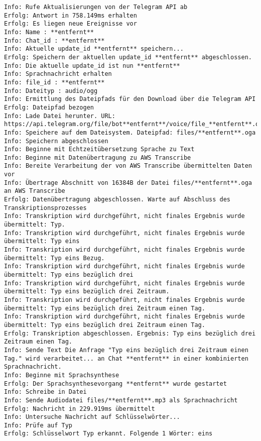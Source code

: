\begin{lstlisting}[caption={Konsolenausgabe bei der Verarbeitung einer eintreffenden Nachricht}, label=log-msg, xleftmargin=6mm]
Info: Rufe Aktualisierungen von der Telegram API ab 
Erfolg: Antwort in 758.149ms erhalten 
Erfolg: Es liegen neue Ereignisse vor 
Info: Name : **entfernt** 
Info: Chat_id : **entfernt** 
Info: Aktuelle update_id **entfernt** speichern... 
Erfolg: Speichern der aktuellen update_id **entfernt** abgeschlossen. 
Info: Die aktuelle update_id ist nun **entfernt** 
Info: Sprachnachricht erhalten 
Info: file_id : **entfernt** 
Info: Dateityp : audio/ogg 
Info: Ermittlung des Dateipfads für den Download über die Telegram API 
Erfolg: Dateipfad bezogen 
Info: Lade Datei herunter. URL: https://api.telegram.org/file/bot**entfernt**/voice/file_**entfernt**.oga 
Info: Speichere auf dem Dateisystem. Dateipfad: files/**entfernt**.oga 
Info: Speichern abgeschlossen 
Info: Beginne mit Echtzeitübersetzung Sprache zu Text 
Info: Beginne mit Datenübertragung zu AWS Transcribe 
Info: Bereite Verarbeitung der von AWS Transcribe übermittelten Daten vor 
Info: Übertrage Abschnitt von 16384B der Datei files/**entfernt**.oga an AWS Transcribe 
Erfolg: Datenübertragung abgeschlossen. Warte auf Abschluss des Transkriptionsprozesses 
Info: Transkription wird durchgeführt, nicht finales Ergebnis wurde übermittelt: Typ. 
Info: Transkription wird durchgeführt, nicht finales Ergebnis wurde übermittelt: Typ eins 
Info: Transkription wird durchgeführt, nicht finales Ergebnis wurde übermittelt: Typ eins Bezug. 
Info: Transkription wird durchgeführt, nicht finales Ergebnis wurde übermittelt: Typ eins bezüglich drei 
Info: Transkription wird durchgeführt, nicht finales Ergebnis wurde übermittelt: Typ eins bezüglich drei Zeitraum. 
Info: Transkription wird durchgeführt, nicht finales Ergebnis wurde übermittelt: Typ eins bezüglich drei Zeitraum einen Tag. 
Info: Transkription wird durchgeführt, nicht finales Ergebnis wurde übermittelt: Typ eins bezüglich drei Zeitraum einen Tag. 
Erfolg: Transkription abgeschlossen. Ergebnis: Typ eins bezüglich drei Zeitraum einen Tag. 
Info: Sende Text Die Anfrage "Typ eins bezüglich drei Zeitraum einen Tag." wird verarbeitet... an Chat **entfernt** in einer kombinierten Sprachnachricht. 
Info: Beginne mit Sprachsynthese 
Erfolg: Der Sprachsynthesevorgang **entfernt** wurde gestartet 
Info: Schreibe in Datei 
Info: Sende Audiodatei files/**entfernt**.mp3 als Sprachnachricht 
Erfolg: Nachricht in 229.919ms übermittelt 
Info: Untersuche Nachricht auf Schlüsselwörter... 
Info: Prüfe auf Typ 
Erfolg: Schlüsselwort Typ erkannt. Folgende 1 Wörter: eins 

\end{lstlisting}
